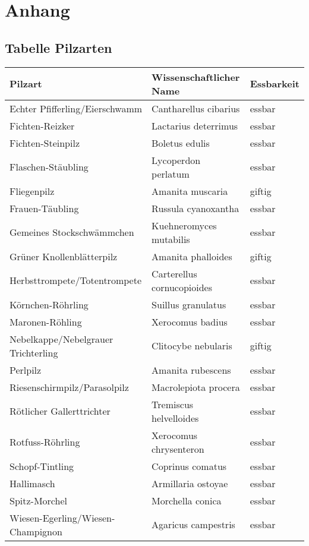 \section{Anhang}

\subsection{Tabelle Pilzarten} \label{table:shrooms}

\begin{center}
	\begin{tabular}{l | l | l}
		Pilzart & Wissenschaftlicher Name & Essbarkeit\\
		\hline
		Echter Pfifferling/Eierschwamm & Cantharellus cibarius & essbar\\
		Fichten-Reizker & Lactarius deterrimus & essbar\\
		Fichten-Steinpilz & Boletus edulis & essbar\\
		Flaschen-Stäubling & Lycoperdon perlatum & essbar\\
		Fliegenpilz & Amanita muscaria & giftig\\
		Frauen-Täubling & Russula cyanoxantha & essbar\\
		Gemeines Stockschwämmchen & Kuehneromyces mutabilis & essbar\\
		Grüner Knollenblätterpilz & Amanita phalloides & giftig\\
		Herbsttrompete/Totentrompete & Carterellus cornucopioides & essbar\\
		Körnchen-Röhrling & Suillus granulatus & essbar\\
		Maronen-Röhling & Xerocomus badius & essbar\\
		Nebelkappe/Nebelgrauer Trichterling & Clitocybe nebularis & giftig\\
		Perlpilz & Amanita rubescens & essbar\\
		Riesenschirmpilz/Parasolpilz & Macrolepiota procera & essbar\\
		Rötlicher Gallerttrichter & Tremiscus helvelloides & essbar\\
		Rotfuss-Röhrling & Xerocomus chrysenteron & essbar\\
		Schopf-Tintling & Coprinus comatus & essbar\\
		Hallimasch & Armillaria ostoyae & essbar\\
		Spitz-Morchel & Morchella conica & essbar\\
		Wiesen-Egerling/Wiesen-Champignon & Agaricus campestris & essbar\\
	\end{tabular}
\end{center}